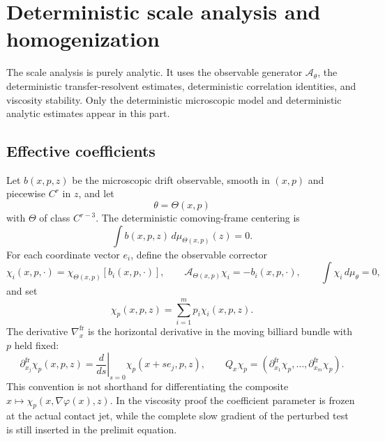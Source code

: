 \documentclass[12pt, letterpaper]{amsart}
\newcommand{\Acal}{\mathcal{A}}
\theoremstyle{plain}
\theoremstyle{definition}
\theoremstyle{remark}
\begin{document}
\section{Deterministic scale analysis and homogenization}
\label{sec:scale_analysis}

The scale analysis is purely analytic.  It uses the observable generator $\Acal_\theta$, the deterministic transfer-resolvent estimates, deterministic correlation identities, and viscosity stability.  Only the deterministic microscopic model and deterministic analytic estimates appear in this part.

\subsection{Effective coefficients}

Let $b(x,p,z)$ be the microscopic drift observable, smooth in $(x,p)$ and
piecewise $C^r$ in $z$, and let
\begin{equation}
    \theta=\Theta(x,p)
\end{equation}
with $\Theta$ of class $C^{r-3}$.  The deterministic comoving-frame centering is
\begin{equation}
\label{eq:drift_centering_effective}
    \int b(x,p,z)\,d\mu_{\Theta(x,p)}(z)=0 .
\end{equation}
For each coordinate vector $e_i$, define the observable corrector
\begin{equation}
\label{eq:first_cell_coordinate_correctors}
    \chi_i(x,p,\cdot)
    =\chi_{\Theta(x,p)}[b_i(x,p,\cdot)],
    \qquad
    \Acal_{\Theta(x,p)}\chi_i=-b_i(x,p,\cdot),
    \qquad \int\chi_i\,d\mu_\theta=0,
\end{equation}
and set
\begin{equation}
\label{eq:first_cell_p_corrector}
    \chi_p(x,p,z)=\sum_{i=1}^m p_i\chi_i(x,p,z).
\end{equation}
The derivative $\nabla_x^{\mathrm{fr}}$ is the horizontal derivative in the
moving billiard bundle with $p$ held fixed:
\begin{equation}
\label{eq:horizontal_derivative_definition}
    \partial_{x_j}^{\mathrm{fr}}\chi_p(x,p,z)
    =\left.\frac{d}{ds}\right|_{s=0}\chi_p(x+s e_j,p,z),
    \qquad
    Q_x\chi_p=(\partial_{x_1}^{\mathrm{fr}}\chi_p,\ldots,
    \partial_{x_m}^{\mathrm{fr}}\chi_p).
\end{equation}
This convention is not shorthand for differentiating the composite
$x\mapsto\chi_p(x,\nabla\varphi(x),z)$.  In the viscosity proof the coefficient
parameter is frozen at the actual contact jet, while the complete slow gradient
of the perturbed test is still inserted in the prelimit equation.
\end{document}
